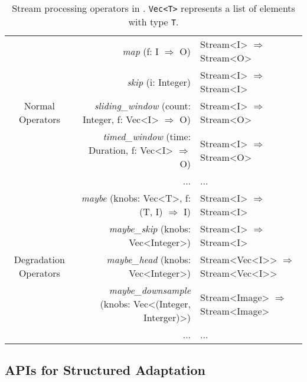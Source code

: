 \begin{table*}
  \small
  \centering
  \begin{tabular}{ c r l }
    \toprule
    \multirow{5}{*}{Normal Operators}
    & \textit{map} (f: I $\Rightarrow$ O) & Stream<I> $\Rightarrow$ Stream<O> \\
    & \textit{skip} (i: Integer) & Stream<I> $\Rightarrow$
                                   Stream<I> \\
    & \textit{sliding\_window} (count: Integer, f: Vec<I> $\Rightarrow$ O) & Stream<I> $\Rightarrow$
                                                                            Stream<O> \\
    & \textit{timed\_window} (time: Duration, f: Vec<I> $\Rightarrow$ O) & Stream<I> $\Rightarrow$
                                                                          Stream<O> \\
    & ... & ... \\
    \midrule
    \multirow{5}{*}{Degradation Operators}
    & \textit{maybe} (knobs: Vec<T>, f:  (T, I) $\Rightarrow$ I) & Stream<I> $\Rightarrow$
                                                                 Stream<I> \\
    & \textit{maybe\_skip} (knobs: Vec<Integer>) & Stream<I> $\Rightarrow$ Stream<I> \\
    & \textit{maybe\_head} (knobs: Vec<Integer>) & Stream<Vec<I>{}> $\Rightarrow$
                                                   Stream<Vec<I>{}> \\
    & \textit{maybe\_downsample} (knobs: Vec<(Integer, Interger)>) & Stream<Image> $\Rightarrow$ Stream<Image> \\
    & ... & ... \\
    \bottomrule
  \end{tabular}
  \caption{Stream processing operators in \sysname{}. \texttt{Vec<T>} represents
    a list of elements with type \texttt{T}.}
  \label{tab:operators}
\end{table*}

\subsection{APIs for Structured Adaptation}
\label{sec:struct-adapt}

